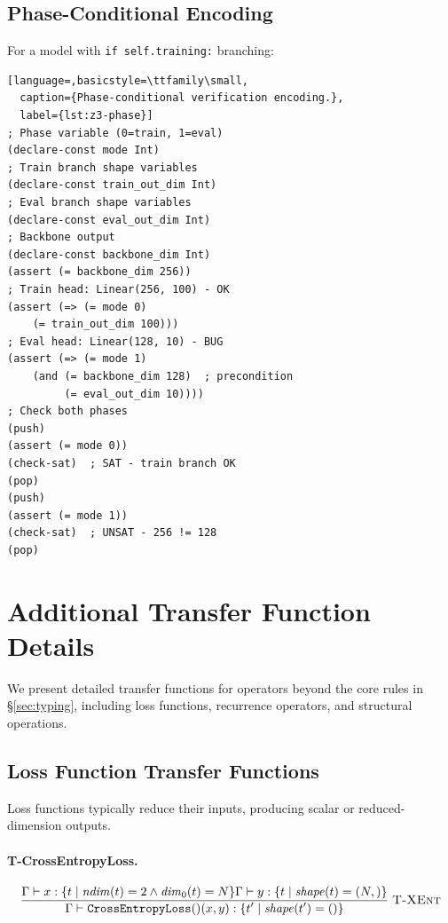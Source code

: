 \documentclass[10pt]{article}
\newcommand{\typerule}[3]{%
  \frac{\displaystyle #2}{\displaystyle #3}
  \;\textsc{#1}%
}
\theoremstyle{plain}
\theoremstyle{definition}
\theoremstyle{remark}
\begin{document}
\subsection{Phase-Conditional Encoding}

For a model with \texttt{if self.training:} branching:

\begin{lstlisting}[language=,basicstyle=\ttfamily\small,
  caption={Phase-conditional verification encoding.},
  label={lst:z3-phase}]
; Phase variable (0=train, 1=eval)
(declare-const mode Int)
; Train branch shape variables
(declare-const train_out_dim Int)
; Eval branch shape variables
(declare-const eval_out_dim Int)
; Backbone output
(declare-const backbone_dim Int)
(assert (= backbone_dim 256))
; Train head: Linear(256, 100) - OK
(assert (=> (= mode 0)
    (= train_out_dim 100)))
; Eval head: Linear(128, 10) - BUG
(assert (=> (= mode 1)
    (and (= backbone_dim 128)  ; precondition
         (= eval_out_dim 10))))
; Check both phases
(push)
(assert (= mode 0))
(check-sat)  ; SAT - train branch OK
(pop)
(push)
(assert (= mode 1))
(check-sat)  ; UNSAT - 256 != 128
(pop)
\end{lstlisting}


\section{Additional Transfer Function Details}\label{app:transfer-details}

We present detailed transfer functions for operators beyond the
core rules in \S\ref{sec:typing}, including loss functions,
recurrence operators, and structural operations.

\subsection{Loss Function Transfer Functions}

Loss functions typically reduce their inputs, producing scalar
or reduced-dimension outputs.

\paragraph{T-CrossEntropyLoss.}
\[
\typerule{T-XEnt}{\Gamma \vdash x : \{t \mid \mathit{ndim}(t) = 2 \land
    \mathit{dim}_0(t) = N\} \\
   \Gamma \vdash y : \{t \mid \mathit{shape}(t) = (N,)\}}{\Gamma \vdash \texttt{CrossEntropyLoss}()(x, y) :
    \{t' \mid \mathit{shape}(t') = ()\}}
\]
\end{document}
